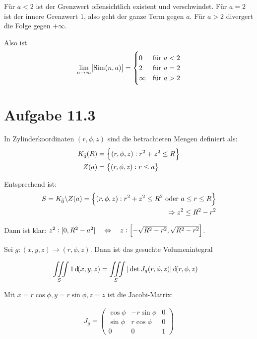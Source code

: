 \documentclass[a4paper,german,12pt,smallheadings]{scrartcl}
\begin{document}
Für $a < 2$ ist der Grenzwert offensichtlich existent und verschwindet. %
Für $a = 2$ ist der innere Grenzwert $1$, also geht der ganze Term gegen $a$.
Für $a > 2$ divergert die Folge gegen $+ \infty$.

Also ist
\begin{align*}
  \lim\limits_{n \to \infty} \envert{\operatorname{Sim}(n,a)} =
  \begin{cases}
    0 &\mbox{für } a < 2 \\
    2 & \mbox{für } a = 2 \\
    \infty & \mbox{für } a > 2 \\
    \end{cases}
\end{align*}

\section*{Aufgabe 11.3}

In Zylinderkoordinaten $(r, \phi, z)$ sind die betrachteten Mengen definiert als:
\begin{align*}
  K_{\overline{0}}(R) &= \cbr{(r, \phi, z): r^2 + z^2 \le R} \\
  Z(a) &= \cbr{(r, \phi, z): r \le a}
\end{align*}

Entsprechend ist:
\begin{align*}
  S = K_{\overline{0}} \backslash Z(a) = \cbr{(r, \phi, z): r^2+z^2 \le R^2 \text{ oder } a \le r \le R} \\
  \Rightarrow z^2 \le R^2 - r^2
\end{align*}

Dann ist klar: $z^2: [0,R^2 -a^2] \quad\Leftrightarrow\quad z: \sbr{-\sqrt{R^2-r^2}, \sqrt{R^2- r^2}}$.

Sei $g: (x,y,z) \to (r, \phi, z)$. Dann ist das gesuchte Volumenintegral

\begin{align*}
  \iiint\limits_{S} 1 \dif(x,y,z) &= \iiint\limits_{S} |\det J_g(r, \phi, z)| \dif(r, \phi, z)
\end{align*}

Mit $x = r \cos \phi, y = r \sin \phi, z = z$ ist die Jacobi-Matrix:

\begin{align*}
  J_g = \begin{pmatrix}
    \cos \phi & -r \sin \phi & 0 \\
    \sin \phi & r \cos \phi & 0 \\
    0 & 0 & 1
  \end{pmatrix}
\end{align*}
\end{document}
